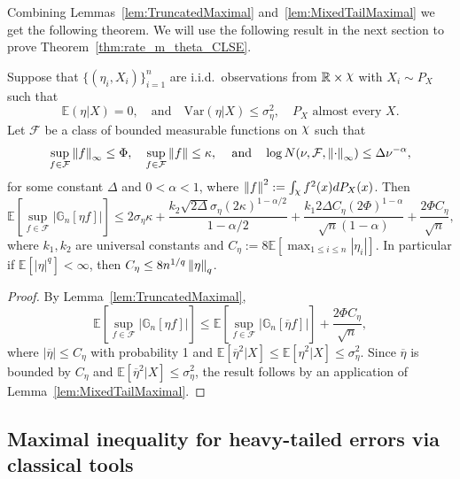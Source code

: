 Combining Lemmas~\ref{lem:TruncatedMaximal} and~\ref{lem:MixedTailMaximal} we get the following theorem. We will use the following result in the next section to prove Theorem~\ref{thm:rate_m_theta_CLSE}.
\begin{thm}\label{thm:MaximalMoment}
Suppose that $\{(\eta_i,X_i)\}_{i=1}^n$ are i.i.d.~observations from $\R \times \rchi$ with $X_i \sim P_X$ such that 
\begin{equation}\label{eq:eta_cond_thm}
 \mathbb{E}(\eta|X)=0, \quad\text{and}\quad \mbox{Var}(\eta|X) \le \sigma^2_{\eta}, \quad P_X \text{ almost every } X.
 \end{equation}
Let $\mathcal{F}$ be a class of bounded measurable functions on $\rchi$ such that
\begin{equation}\label{eq:cond_Lema_chain}
\sup_{f\in\mathcal{F}}\left\lVert f\right\rVert_{\infty} \le \Phi,\quad\sup_{f\in\mathcal{F}}\left\lVert f\right\rVert \le \kappa,\,\quad\mbox{and}\quad \log N(\nu, \mathcal{F}, \left\lVert\cdot\right\rVert_{\infty}) \le \Delta\nu^{-\alpha},
\end{equation}
for some constant $\Delta$ and $0 < \alpha < 1$, where $\norm{f}^2 := \int_{\rchi} f^2(x)dP_X(x)$.
Then
\[
\mathbb{E}\left[\sup_{f\in\mathcal{F}}|\mathbb{G}_n\left[\eta f\right]|\right] \le 2\sigma_{\eta}\kappa + \frac{k_2\sqrt{2\Delta}\sigma_{\eta}(2\kappa)^{1 - \alpha/2}}{1 - \alpha/2} + \frac{k_1 2\Delta C_{\eta}(2\Phi)^{1 - \alpha}}{\sqrt{n}(1 - \alpha)} + \frac{2\Phi C_{\eta}}{\sqrt{n}},
\]
where $k_1, k_2$ are universal constants and $C_{\eta} := 8\mathbb{E}\left[\max_{1\le i\le n}|\eta_i|\right].$ 
In particular if $\mathbb{E}\left[|\eta|^q\right] < \infty$, then $C_{\eta} \le 8n^{1/q}\left\lVert\eta\right\rVert_q$.
\end{thm}
\begin{proof}
By Lemma~\ref{lem:TruncatedMaximal},
\[
\mathbb{E}\left[\sup_{f\in\mathcal{F}}\left|\mathbb{G}_n\left[\eta f\right]\right|\right] \le \mathbb{E}\left[\sup_{f\in\mathcal{F}}\left|\mathbb{G}_n\left[\overline{\eta} f\right]\right|\right] + \frac{2\Phi C_{\eta}}{\sqrt{n}},
\]
where $|\overline{\eta}| \le C_{\eta}$ with probability 1 and $\mathbb{E}\left[\overline{\eta}^2|X\right] \le \mathbb{E}[\eta^2|X] \le \sigma^2_{\eta}.$
Since $\overline{\eta}$ is bounded by $C_\eta$ and $\mathbb{E}[\overline{\eta}^2|X] \le \sigma_\eta^2$, the result follows by an application of Lemma~\ref{lem:MixedTailMaximal}.
\end{proof}
\subsection{Maximal inequality for heavy-tailed errors via classical tools} %
\label{sub:maximal_inequality_for_heavy_tailed_errors_via_classical_tools}

